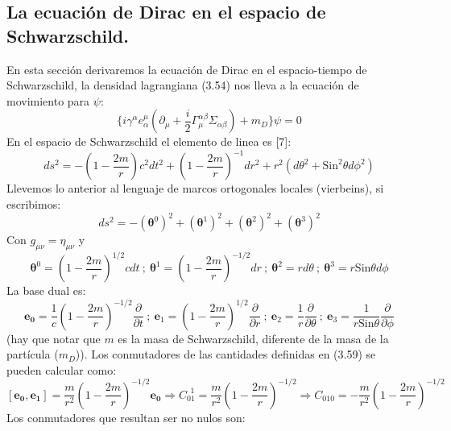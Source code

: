 \subsection{La ecuación de Dirac en el espacio de Schwarzschild.}
En esta sección derivaremos la ecuación de Dirac en el espacio-tiempo de Schwarzschild, la densidad lagrangiana (3.54) nos lleva a la ecuación de movimiento para $\psi$:
\begin{equation}
\{i\gamma^{\alpha}e_{\alpha}^{\mu}(\partial_{\mu}+\frac{i}{2}\Gamma_{\mu}^{\alpha\beta}\Sigma_{\alpha\beta})+m_{D}\}\psi=0
\end{equation}
En el espacio de Schwarzschild el elemento de linea es [7]:
\begin{equation}
ds^{2}=-\left(1-\frac{2m}{r}\right)c^{2}dt^{2}+\left(1-\frac{2m}{r}\right)^{-1}dr^{2}+r^{2}(d\theta^{2}+\text{Sin}^{2}\theta d\phi^{2})
\end{equation}
Llevemos lo anterior al lenguaje de marcos ortogonales locales (vierbeins), si escribimos:
\begin{equation}
ds^{2}=-(\mathbf{\theta}^{0})^{2}+(\mathbf{\theta}^{1})^{2}+(\mathbf{\theta}^{2})^{2}+(\mathbf{\theta}^{3})^{2}
\end{equation}
Con $g_{\mu\nu}=\eta_{\mu\nu}$ y
\begin{equation}
\mathbf{\theta}^{0}=\left(1-\frac{2m}{r}\right)^{1/2}cdt\ ;\ \mathbf{\theta}^{1}=\left(1-\frac{2m}{r}\right)^{-1/2}dr\ ;\ \mathbf{\theta}^{2}=rd\theta\ ;\ \mathbf{\theta}^{3}=r\text{Sin}\theta d\phi
\end{equation}
La base dual es:
\begin{equation}
\mathbf{e_{0}}=\frac{1}{c}\left(1-\frac{2m}{r}\right)^{-1/2}\frac{\partial}{\partial t}\ ;\ \mathbf{e}_{1}=\left(1-\frac{2m}{r}\right)^{1/2}\frac{\partial}{\partial r}\ ;\ \mathbf{e}_{2}=\frac{1}{r}\frac{\partial}{\partial\theta}\ ;\ \mathbf{e}_{3}=\frac{1}{r\text{Sin}\theta}\frac{\partial}{\partial\phi}
\end{equation}
(hay que notar que $m$ es la masa de Schwarzschild, diferente de la masa de la partícula ($m_D$)). Los conmutadores de las cantidades definidas en (3.59) se pueden calcular como:
\begin{equation}
\nonumber [\mathbf{e_{0}},\mathbf{e_{1}}]=\frac{m}{r^{2}}\left(1-\frac{2m}{r}\right)^{-1/2}\mathbf{e_{0}}\Rightarrow C_{01}^{\ \ 1}=\frac{m}{r^{2}}\left(1-\frac{2m}{r}\right)^{-1/2}\Rightarrow C_{010}=-\frac{m}{r^{2}}\left(1-\frac{2m}{r}\right)^{-1/2}
\end{equation}
Los conmutadores que resultan ser no nulos son:
